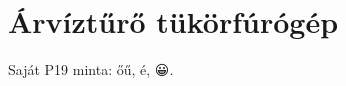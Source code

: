 \documentclass{article}
\begin{document}
\section{Árvíztűrő tükörfúrógép}
Saját P19 minta: őű, é, 😀.
\end{document}

